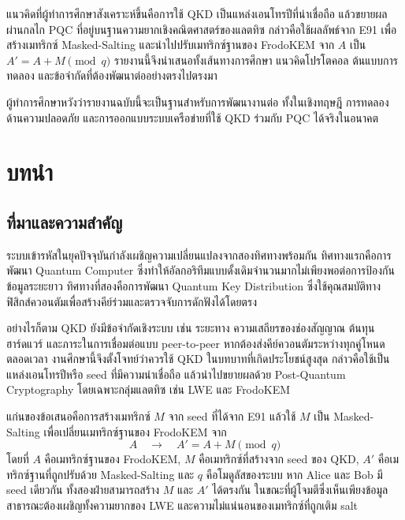 \documentclass[14pt,a4paper]{extarticle}
\newcommand{\eng}[1]{\textenglish{#1}}
\begin{document}
แนวคิดที่ผู้ทำการศึกษาสังเคราะห์ขึ้นคือการใช้ QKD เป็นแหล่งเอนโทรปีที่น่าเชื่อถือ แล้วขยายผลผ่านกลไก \eng{PQC} ที่อยู่บนฐานความยากเชิงคณิตศาสตร์ของแลตทิซ กล่าวคือใช้ผลลัพธ์จาก \eng{E91} เพื่อสร้างเมทริกซ์ \eng{Masked-Salting} และนำไปปรับเมทริกซ์ฐานของ FrodoKEM จาก $A$ เป็น $A' = A + M \pmod q$ รายงานนี้จึงนำเสนอทั้งเส้นทางการศึกษา แนวคิดโปรโตคอล ต้นแบบการทดลอง และข้อจำกัดที่ต้องพัฒนาต่ออย่างตรงไปตรงมา

ผู้ทำการศึกษาหวังว่ารายงานฉบับนี้จะเป็นฐานสำหรับการพัฒนางานต่อ ทั้งในเชิงทฤษฎี การทดลองด้านความปลอดภัย และการออกแบบระบบเครือข่ายที่ใช้ QKD ร่วมกับ PQC ได้จริงในอนาคต

\clearpage
\tableofcontents
\clearpage
{}

\section{บทนำ}
\subsection{ที่มาและความสำคัญ}
ระบบเข้ารหัสในยุคปัจจุบันกำลังเผชิญความเปลี่ยนแปลงจากสองทิศทางพร้อมกัน ทิศทางแรกคือการพัฒนา \eng{Quantum Computer} ซึ่งทำให้อัลกอริทึมแบบดั้งเดิมจำนวนมากไม่เพียงพอต่อการป้องกันข้อมูลระยะยาว ทิศทางที่สองคือการพัฒนา \eng{Quantum Key Distribution} ซึ่งใช้คุณสมบัติทางฟิสิกส์ควอนตัมเพื่อสร้างคีย์ร่วมและตรวจจับการดักฟังได้โดยตรง

อย่างไรก็ตาม QKD ยังมีข้อจำกัดเชิงระบบ เช่น ระยะทาง ความเสถียรของช่องสัญญาณ ต้นทุนฮาร์ดแวร์ และภาระในการเชื่อมต่อแบบ \eng{peer-to-peer} หากต้องส่งคีย์ควอนตัมระหว่างทุกคู่โหนดตลอดเวลา งานศึกษานี้จึงตั้งโจทย์ว่าควรใช้ QKD ในบทบาทที่เกิดประโยชน์สูงสุด กล่าวคือใช้เป็นแหล่งเอนโทรปีหรือ seed ที่มีความน่าเชื่อถือ แล้วนำไปขยายผลด้วย \eng{Post-Quantum Cryptography} โดยเฉพาะกลุ่มแลตทิซ เช่น \eng{LWE} และ FrodoKEM

แก่นของข้อเสนอคือการสร้างเมทริกซ์ $M$ จาก seed ที่ได้จาก \eng{E91} แล้วใช้ $M$ เป็น \eng{Masked-Salting} เพื่อเปลี่ยนเมทริกซ์ฐานของ FrodoKEM จาก
\[
    A \quad \longrightarrow \quad A' = A + M \pmod q
\]
โดยที่ $A$ คือเมทริกซ์ฐานของ FrodoKEM, $M$ คือเมทริกซ์ที่สร้างจาก seed ของ QKD, $A'$ คือเมทริกซ์ฐานที่ถูกปรับด้วย \eng{Masked-Salting} และ $q$ คือโมดูลัสของระบบ
หาก Alice และ Bob มี seed เดียวกัน ทั้งสองฝ่ายสามารถสร้าง $M$ และ $A'$ ได้ตรงกัน ในขณะที่ผู้โจมตีซึ่งเห็นเพียงข้อมูลสาธารณะต้องเผชิญทั้งความยากของ LWE และความไม่แน่นอนของเมทริกซ์ที่ถูกเติม salt
\end{document}

